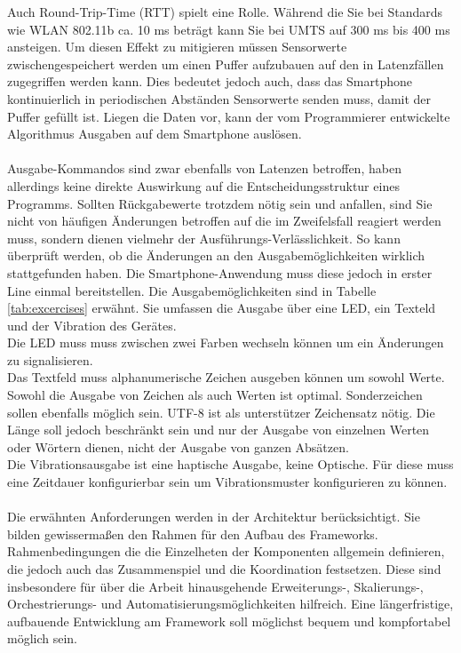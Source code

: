 \documentclass[11pt,a4paper]{report}
\begin{document}
Auch Round-Trip-Time (RTT) spielt eine Rolle.
Während die Sie bei Standards wie WLAN 802.11b ca. 10 ms beträgt kann Sie bei UMTS auf 300 ms bis 400 ms ansteigen.\cite{network_latencies}
Um diesen Effekt zu mitigieren müssen Sensorwerte zwischengespeichert werden um einen Puffer aufzubauen auf den in Latenzfällen zugegriffen werden kann.
Dies bedeutet jedoch auch, dass das Smartphone kontinuierlich in periodischen Abständen Sensorwerte senden muss, damit der Puffer gefüllt ist.
Liegen die Daten vor, kann der vom Programmierer entwickelte Algorithmus Ausgaben auf dem Smartphone auslösen.
\\\\
Ausgabe-Kommandos sind zwar ebenfalls von Latenzen betroffen, haben allerdings keine direkte Auswirkung auf die Entscheidungsstruktur eines Programms.
Sollten Rückgabewerte trotzdem nötig sein und anfallen, sind Sie nicht von häufigen Änderungen betroffen auf die im Zweifelsfall reagiert werden muss, sondern dienen vielmehr der Ausführungs-Verlässlichkeit.
So kann überprüft werden, ob die Änderungen an den Ausgabemöglichkeiten wirklich stattgefunden haben.
Die Smartphone-Anwendung muss diese jedoch in erster Line einmal bereitstellen.
Die Ausgabemöglichkeiten sind in Tabelle \ref{tab:excercises} erwähnt.
Sie umfassen die Ausgabe über eine LED, ein Texteld und der Vibration des Gerätes.
\\
Die LED muss muss zwischen zwei Farben wechseln können um ein Änderungen zu signalisieren.
\\
Das Textfeld muss alphanumerische Zeichen ausgeben können um sowohl Werte.
Sowohl die Ausgabe von Zeichen als auch Werten ist optimal.
Sonderzeichen sollen ebenfalls möglich sein.
UTF-8 ist als unterstützer Zeichensatz nötig.
Die Länge soll jedoch beschränkt sein und nur der Ausgabe von einzelnen Werten oder Wörtern dienen, nicht der Ausgabe von ganzen Absätzen.
\\
Die Vibrationsausgabe ist eine haptische Ausgabe, keine Optische.
Für diese muss eine Zeitdauer konfigurierbar sein um Vibrationsmuster konfigurieren zu können.
\\\\
Die erwähnten Anforderungen werden in der Architektur berücksichtigt.
Sie bilden gewissermaßen den Rahmen für den Aufbau des Frameworks.
Rahmenbedingungen die die Einzelheten der Komponenten allgemein definieren, die jedoch auch das Zusammenspiel und die Koordination festsetzen.
Diese sind insbesondere für über die Arbeit hinausgehende Erweiterungs-, Skalierungs-, Orchestrierungs- und Automatisierungsmöglichkeiten hilfreich.
Eine längerfristige, aufbauende Entwicklung am Framework soll möglichst bequem und kompfortabel möglich sein.
\end{document}
